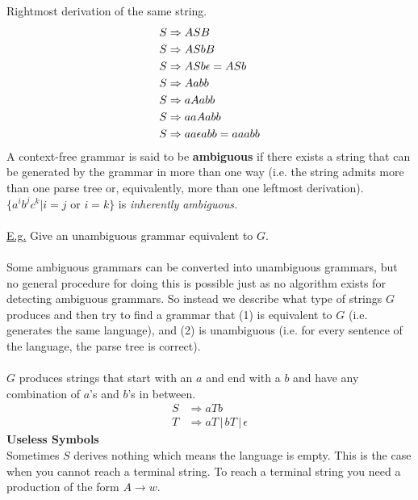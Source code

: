 \documentclass[8pt,letterpaper,twocolumn]{article}
\begin{document}
  Rightmost derivation of the same string.
  \begin{align} %
    \setcounter{equation}{0} %
    S &\Rightarrow ASB \\
    \setcounter{equation}{5}
    S &\Rightarrow ASbB \\
    S &\Rightarrow ASb \epsilon = ASb \\
    \setcounter{equation}{1}
    S &\Rightarrow Aabb \\
    \setcounter{equation}{3}
    S &\Rightarrow aAabb \\
    \setcounter{equation}{3}
    S &\Rightarrow aaAabb \\
    S &\Rightarrow aa \epsilon abb = aaabb
  \end{align}
A context-free grammar is said to be \textbf{ambiguous} if there exists a string that can be
generated by the grammar in more than one way (i.e. the string admits more than one parse tree or,
equivalently, more than one leftmost derivation).
$\{a^i b^j c^k | i=j \mbox{ or } i=k\}$ is \emph{inherently ambiguous.} \\
\\
\underline{E.g.} %
  Give an unambiguous grammar equivalent to $G$. \\
  \\
  Some ambiguous grammars can be converted into unambiguous grammars, but no general procedure
  for doing this is possible just as no algorithm exists for detecting ambiguous grammars.
  So instead we describe what type of strings $G$ produces and then try to find a grammar that
  (1) is equivalent to $G$ (i.e. generates the same language), and (2) is unambiguous
  (i.e. for every sentence of the language, the parse tree is correct).\\
  \\
  $G$ produces strings that start with an $a$ and end with a $b$ and have any combination of $a$'s and
  $b$'s in between.
  \begin{align*}
    S &\Rightarrow aTb \\
    T &\Rightarrow aT \,|\, bT \,|\, \epsilon
  \end{align*}
\textbf{Useless Symbols}\\
Sometimes $S$ derives nothing which means the language is empty.
This is the case when you cannot reach a terminal string.
To reach a terminal string you need a production of the form $A \rightarrow w$. \\
\end{document}
